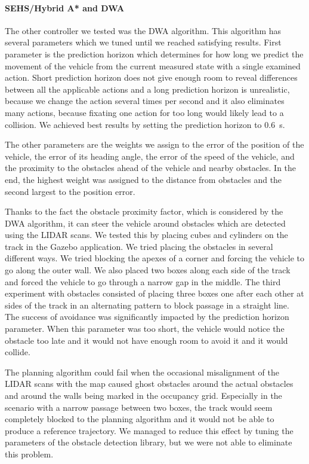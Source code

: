 \paragraph{\gls{SEHS}/Hybrid A* and \gls{DWA}}
The other controller we tested was the \gls{DWA} algorithm. This algorithm has several parameters which we tuned until we reached satisfying results. First parameter is the prediction horizon which determines for how long we predict the movement of the vehicle from the current measured state with a single examined action. Short prediction horizon does not give enough room to reveal differences between all the applicable actions and a long prediction horizon is unrealistic, because we change the action several times per second and it also eliminates many actions, because fixating one action for too long would likely lead to a collision. We achieved best results by setting the prediction horizon to \SI{0.6}{\second}.

The other parameters are the weights we assign to the error of the position of the vehicle, the error of its heading angle, the error of the speed of the vehicle, and the proximity to the obstacles ahead of the vehicle and nearby obstacles. In the end, the highest weight was assigned to the distance from obstacles and the second largest to the position error.

Thanks to the fact the obstacle proximity factor, which is considered by the \gls*{DWA} algorithm, it can steer the vehicle around obstacles which are detected using the \gls*{LIDAR} scans. We tested this by placing cubes and cylinders on the track in the Gazebo application. We tried placing the obstacles in several different ways. We tried blocking the apexes of a corner and forcing the vehicle to go along the outer wall. We also placed two boxes along each side of the track and forced the vehicle to go through a narrow gap in the middle. The third experiment with obstacles consisted of placing three boxes one after each other at sides of the track in an alternating pattern to block passage in a straight line. The success of avoidance was significantly impacted by the prediction horizon parameter. When this parameter was too short, the vehicle would notice the obstacle too late and it would not have enough room to avoid it and it would collide.

The planning algorithm could fail when the occasional misalignment of the \gls*{LIDAR} scans with the map caused ghost obstacles around the actual obstacles and around the walls being marked in the occupancy grid. Especially in the scenario with a narrow passage between two boxes, the track would seem completely blocked to the planning algorithm and it would not be able to produce a reference trajectory. We managed to reduce this effect by tuning the parameters of the obstacle detection library, but we were not able to eliminate this problem.

